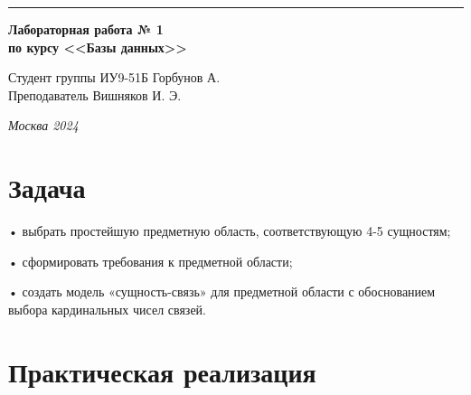 \documentclass[a4paper, 14pt]{extarticle}
\begin{document}
\begin{titlepage}
\vspace*{-16pt}
\hspace{30pt}\rule{0.866\textwidth}{0.4pt}
  
\vspace{11em}

\begin{center}
\Large {\bf Лабораторная работа № 1} \\ 
\large {\bf по курсу <<Базы данных>>}\\
\end{center}\normalsize

\vspace{8em}


\begin{flushright}
  {Студент группы ИУ9-51Б Горбунов А.\hspace*{15pt} \\
  \vspace{2ex}
  Преподаватель Вишняков И. Э.\hspace*{15pt}}
\end{flushright}

\bigskip

\vfill
 

\begin{center}
\textsl{Москва 2024}
\end{center}
\end{titlepage}

\renewcommand{\ttdefault}{pcr}

\setlength{\tabcolsep}{3pt}
\newpage
\setcounter{page}{2}

\section{Задача}\label{Sect::task}
\par

• выбрать простейшую предметную область, соответствующую 4-5 сущностям;
    
• сформировать требования к предметной области;

• создать модель «сущность-связь» для предметной области с обоснованием выбора кардинальных чисел
связей.

\section{Практическая реализация}\label{Sect::task}
\par
\end{document}
